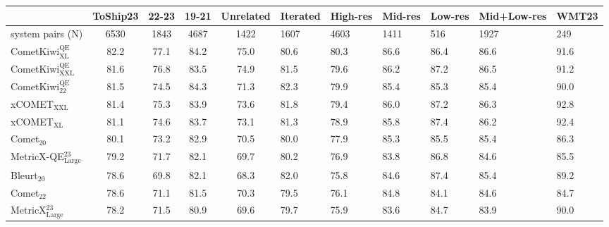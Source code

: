 \begin{tabular}{lcccc}
\toprule
{} & \bf ToShip23 & \bf 22-23 & \bf 19-21 & \bf Unrelated & \bf Iterated & \bf High-res & \bf Mid-res & \bf Low-res & \bf Mid+Low-res & \bf WMT23 \\
\midrule
system pairs (N)                        &         6530 &      1843 &      4687 &          1422 &         1607 &         4603 &        1411 &         516 &            1927 &       249 \\
CometKiwi$_\textrm{XL}^\textrm{QE}$     &         82.2 &      77.1 &      84.2 &          75.0 &         80.6 &         80.3 &        86.6 &        86.4 &            86.6 &      91.6 \\
CometKiwi$_\textrm{XXL}^\textrm{QE}$    &         81.6 &      76.8 &      83.5 &          74.9 &         81.5 &         79.6 &        86.2 &        87.2 &            86.5 &      91.2 \\
CometKiwi$_\textrm{22}^\textrm{QE}$     &         81.5 &      74.5 &      84.3 &          71.3 &         82.3 &         79.9 &        85.4 &        85.3 &            85.4 &      90.0 \\
xCOMET$_\textrm{XXL}$                   &         81.4 &      75.3 &      83.9 &          73.6 &         81.8 &         79.4 &        86.0 &        87.2 &            86.3 &      92.8 \\
xCOMET$_\textrm{XL}$                    &         81.1 &      74.6 &      83.7 &          73.1 &         81.3 &         78.9 &        85.8 &        87.4 &            86.2 &      92.4 \\
Comet$_\textrm{20}$                     &         80.1 &      73.2 &      82.9 &          70.5 &         80.0 &         77.9 &        85.3 &        85.5 &            85.4 &      86.3 \\
MetricX-QE$_\textrm{Large}^\textrm{23}$ &         79.2 &      71.7 &      82.1 &          69.7 &         80.2 &         76.9 &        83.8 &        86.8 &            84.6 &      85.5 \\
Bleurt$_\textrm{20}$                    &         78.6 &      69.8 &      82.1 &          68.3 &         82.0 &         75.8 &        84.6 &        87.4 &            85.4 &      89.2 \\
Comet$_\textrm{22}$                     &         78.6 &      71.1 &      81.5 &          70.3 &         79.5 &         76.1 &        84.8 &        84.1 &            84.6 &      84.7 \\
MetricX$_\textrm{Large}^\textrm{23}$    &         78.2 &      71.5 &      80.9 &          69.6 &         79.7 &         75.9 &        83.6 &        84.7 &            83.9 &      90.0 \\

\end{tabular}
